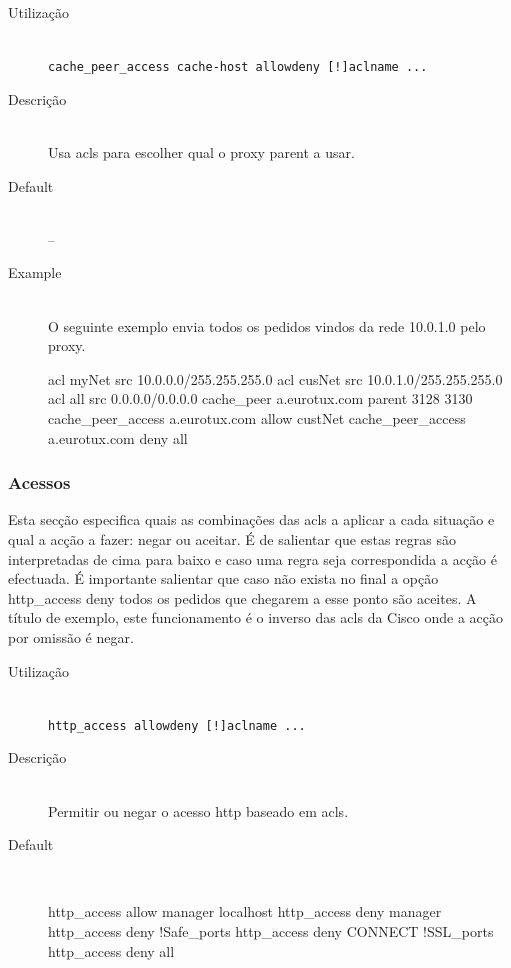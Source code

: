 \begin{description}
\item[Utilização]~\\
\texttt{cache\_peer\_access cache-host allow\textbar{}deny [!]aclname ...}

\item[Descrição]~\\
Usa acls para escolher qual o proxy parent a usar.

\item[Default]~\\
--

\item[Example]~\\
O seguinte exemplo envia todos os pedidos vindos da rede 10.0.1.0 pelo
proxy.

\begin{Output}
acl myNet src 10.0.0.0/255.255.255.0
acl cusNet src 10.0.1.0/255.255.255.0
acl all src 0.0.0.0/0.0.0.0
cache_peer a.eurotux.com parent 3128 3130
cache_peer_access a.eurotux.com allow custNet
cache_peer_access a.eurotux.com deny all
\end{Output}
\end{description}

\subsubsection{Acessos}

Esta secção especifica quais as combinações das acls a
aplicar a cada situação e qual a acção a fazer: negar ou
aceitar.
É de salientar que estas regras são interpretadas de cima
para baixo e caso uma regra seja correspondida a acção é
efectuada.
É importante salientar que caso não exista no final a
opção http\_access deny todos os pedidos que chegarem a esse
ponto são aceites.
A título de exemplo, este funcionamento é o inverso das acls
da Cisco onde a acção por omissão é negar.


\begin{description}
\item[Utilização]~\\
\texttt{http\_access allow\textbar{}deny [!]aclname ...}

\item[Descrição]~\\
Permitir ou negar o acesso http baseado em acls.

\item[Default]~\\
\begin{Output}
http_access allow manager localhost
http_access deny manager
http_access deny !Safe_ports
http_access deny CONNECT !SSL_ports
http_access deny all
\end{Output}
\end{description}


